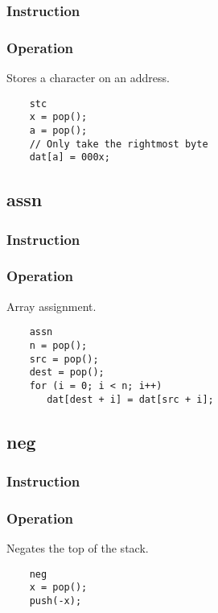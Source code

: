 \subsubsection{Instruction}

\subsubsection{Operation}
Stores a character on an address.

	\begin{lstlisting}
	stc
	x = pop();
	a = pop();
	// Only take the rightmost byte
	dat[a] = 000x;
	\end{lstlisting}

\subsection{assn}
\subsubsection{Instruction}

\subsubsection{Operation}
Array assignment.

	\begin{lstlisting}
	assn
	n = pop();
	src = pop();
	dest = pop();
	for (i = 0; i < n; i++)
	   dat[dest + i] = dat[src + i];
	\end{lstlisting}

\subsection{neg}
\subsubsection{Instruction}

\subsubsection{Operation}
Negates the top of the stack.

	\begin{lstlisting}
	neg
	x = pop();
	push(-x);
	\end{lstlisting}

